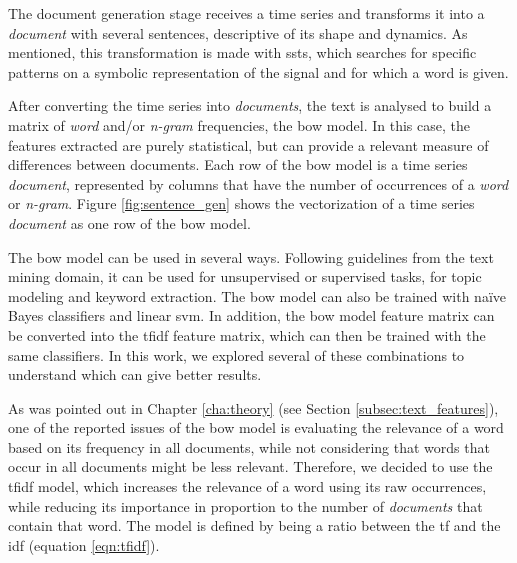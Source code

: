 The document generation stage receives a time series and transforms it into a \textit{document} with several sentences, descriptive of its shape and dynamics. As mentioned, this transformation is made with \gls{ssts}, which searches for specific patterns on a symbolic representation of the signal and for which a word is given.  
\par
After converting the time series into \textit{documents}, the text is analysed to build a matrix of \textit{word} and/or \textit{n-gram} frequencies, the \gls{bow} model. In this case, the features extracted are purely statistical, but can provide a relevant measure of differences between documents. Each row of the \gls{bow} model is a time series \textit{document}, represented by columns that have the number of occurrences of a \textit{word} or \textit{n-gram}. Figure \ref{fig:sentence_gen} shows the vectorization of a time series \textit{document} as one row of the \gls{bow} model.

The \gls{bow} model can be used in several ways. Following guidelines from the text mining domain, it can be used for unsupervised or supervised tasks, for topic modeling and keyword extraction. The \gls{bow} model can also be trained with naïve Bayes classifiers and linear \gls{svm}\cite{scikit-learn}. In addition, the \gls{bow} model feature matrix can be converted into the \gls{tfidf} feature matrix, which can then be trained with the same classifiers. In this work, we explored several of these combinations to understand which can give better results.
\par
As was pointed out in Chapter \ref{cha:theory} (see Section \ref{subsec:text_features}), one of the reported issues of the \gls{bow} model is evaluating the relevance of a word based on its frequency in all documents, while not considering that words that occur in all documents might be less relevant. Therefore, we decided to use the \gls{tfidf} model, which increases the relevance of a word using its raw occurrences, while reducing its importance in proportion to the number of \textit{documents} that contain that word. The model is defined by being a ratio between the \gls{tf} and the \gls{idf} (equation \ref{eqn:tfidf}).

